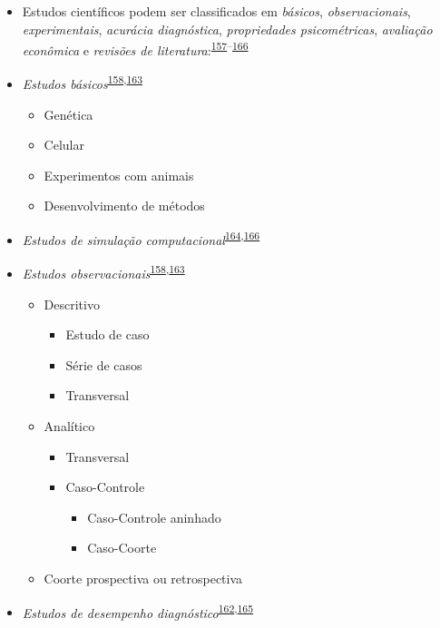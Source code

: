 \documentclass[
  a4paper,
]{book}
\begin{document}
\begin{itemize}
\item
  Estudos científicos podem ser classificados em \emph{básicos}, \emph{observacionais}, \emph{experimentais}, \emph{acurácia diagnóstica}, \emph{propriedades psicométricas}, \emph{avaliação econômica} e \emph{revisões de literatura}:\textsuperscript{\protect\hyperlink{ref-Grant2009}{157}--\protect\hyperlink{ref-chipman2022}{166}}
\item
  \emph{Estudos básicos}\textsuperscript{\protect\hyperlink{ref-Suxfct2014}{158},\protect\hyperlink{ref-Chidambaram2019}{163}}

  \begin{itemize}
  \item
    Genética
  \item
    Celular
  \item
    Experimentos com animais
  \item
    Desenvolvimento de métodos
  \end{itemize}
\item
  \emph{Estudos de simulação computacional}\textsuperscript{\protect\hyperlink{ref-Erdemir2020}{164},\protect\hyperlink{ref-chipman2022}{166}}
\item
  \emph{Estudos observacionais}\textsuperscript{\protect\hyperlink{ref-Suxfct2014}{158},\protect\hyperlink{ref-Chidambaram2019}{163}}

  \begin{itemize}
  \item
    Descritivo

    \begin{itemize}
    \item
      Estudo de caso
    \item
      Série de casos
    \item
      Transversal
    \end{itemize}
  \item
    Analítico

    \begin{itemize}
    \item
      Transversal
    \item
      Caso-Controle

      \begin{itemize}
      \item
        Caso-Controle aninhado
      \item
        Caso-Coorte
      \end{itemize}
    \end{itemize}
  \item
    Coorte prospectiva ou retrospectiva
  \end{itemize}
\item
  \emph{Estudos de desempenho diagnóstico}\textsuperscript{\protect\hyperlink{ref-Chassuxe92019}{162},\protect\hyperlink{ref-Yang2021}{165}}


\end{itemize}
\end{document}
